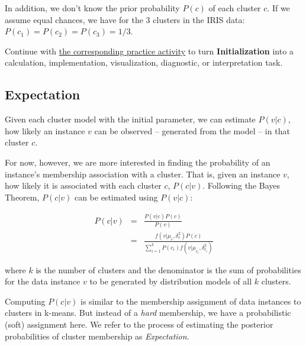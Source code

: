 \documentclass[
  letterpaper,
]{scrbook}
\begin{document}
In addition, we don't know the prior probability \(P(c)\) of each
cluster \(c\). If we assume equal chances, we have for the \(3\)
clusters in the IRIS data: \(P(c_1)=P(c_2)=P(c_3)=1/3\).

\begin{tcolorbox}[enhanced jigsaw, arc=.35mm, bottomrule=.15mm, bottomtitle=1mm, breakable, colback=white, colbacktitle=quarto-callout-tip-color!10!white, colframe=quarto-callout-tip-color-frame, coltitle=black, left=2mm, leftrule=.75mm, opacityback=0, opacitybacktitle=0.6, rightrule=.15mm, title=\textcolor{quarto-callout-tip-color}{\faLightbulb}\hspace{0.5em}{Put it into practice}, titlerule=0mm, toprule=.15mm, toptitle=1mm]

Continue with \hyperref[sec-pr-10-initialization]{the corresponding
practice activity} to turn \textbf{Initialization} into a calculation,
implementation, visualization, diagnostic, or interpretation task.

\end{tcolorbox}

\subsection{Expectation}\label{expectation}

Given each cluster model with the initial parameter, we can estimate
\(P(v|c)\), how likely an instance \(v\) can be observed -- generated
from the model -- in that cluster \(c\).

For now, however, we are more interested in finding the probability of
an instance's membership association with a cluster. That is, given an
instance \(v\), how likely it is associated with each cluster \(c\),
\(P(c|v)\). Following the Bayes Theorem, \(P(c|v)\) can be estimated
using \(P(v|c)\):

\[\begin{aligned}
  P(c|v)
  & = & \frac{P(v|c) P(c)}{P(v)}  \\
  & = & \frac{f(v|\mu_c,\delta_c^2) P(c)}{\sum_{i=1}^{k} P(c_i) f(v|\mu_{c_i},\delta_{c_i}^2)}
\end{aligned}\]

where \(k\) is the number of clusters and the denominator is the sum of
probabilities for the data instance \(v\) to be generated by
distribution models of all \(k\) clusters.

Computing \(P(c|v)\) is similar to the membership assignment of data
instances to clusters in k-means. But instead of a \emph{hard}
membership, we have a probabilistic (soft) assignment here. We refer to
the process of estimating the posterior probabilities of cluster
membership as \emph{Expectation}.
\end{document}
